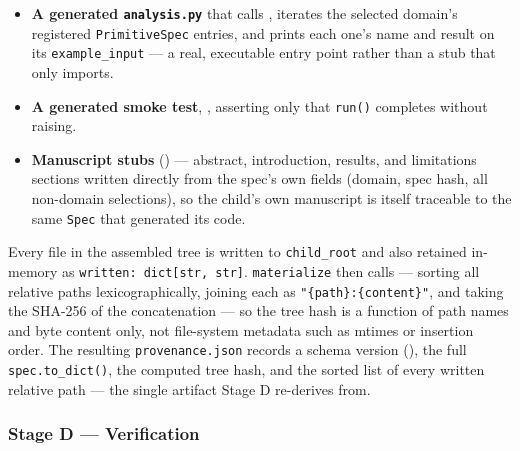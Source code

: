 \documentclass[
]{article}
\begin{document}
\begin{itemize}
  own installable project (\texttt{name\ =\ "child\_\{domain\}"},
  \texttt{numpy}/\texttt{matplotlib}/\texttt{pyyaml} runtime deps,
  pytest configured with \texttt{pythonpath\ =\ {[}"."{]}}).
\item
  \textbf{A generated \texttt{analysis.py}} that calls
  , iterates the selected domain's
  registered \texttt{PrimitiveSpec} entries, and prints each one's name
  and result on its \texttt{example\_input} --- a real, executable entry
  point rather than a stub that only imports.
\item
  \textbf{A generated smoke test}, ,
  asserting only that \texttt{run()} completes without raising.
\item
  \textbf{Manuscript stubs} () --- abstract,
  introduction, results, and limitations sections written directly from
  the spec's own fields (domain, spec hash, all non-domain selections),
  so the child's own manuscript is itself traceable to the same
  \texttt{Spec} that generated its code.
\end{itemize}

Every file in the assembled tree is written to \texttt{child\_root} and
also retained in-memory as \texttt{written:\ dict{[}str,\ str{]}}.
\texttt{materialize} then calls
 --- sorting all
relative paths lexicographically, joining each as
\texttt{"\{path\}:\{content\}"}, and taking the SHA-256 of the
concatenation --- so the tree hash is a function of path names and byte
content only, not file-system metadata such as mtimes or insertion
order. The resulting \texttt{provenance.json} records a schema version
(), the full
\texttt{spec.to\_dict()}, the computed tree hash, and the sorted list of
every written relative path --- the single artifact Stage D re-derives
from.

\subsubsection{Stage D --- Verification}\label{stage-d-verification}
\end{document}
